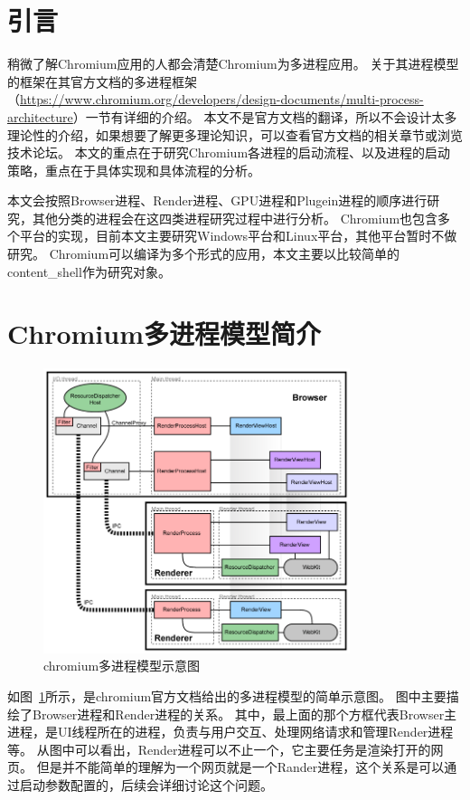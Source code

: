 
\section{引言}
稍微了解Chromium应用的人都会清楚Chromium为多进程应用。
关于其进程模型的框架在其官方文档的多进程框架（\url{https://www.chromium.org/developers/design-documents/multi-process-architecture}）一节有详细的介绍。
本文不是官方文档的翻译，所以不会设计太多理论性的介绍，如果想要了解更多理论知识，可以查看官方文档的相关章节或浏览技术论坛。
本文的重点在于研究Chromium各进程的启动流程、以及进程的启动策略，重点在于具体实现和具体流程的分析。

本文会按照Browser进程、Render进程、GPU进程和Plugein进程的顺序进行研究，其他分类的进程会在这四类进程研究过程中进行分析。
Chromium也包含多个平台的实现，目前本文主要研究Windows平台和Linux平台，其他平台暂时不做研究。
Chromium可以编译为多个形式的应用，本文主要以比较简单的content\_shell作为研究对象。

\section{Chromium多进程模型简介}

\begin{figure}[H] 
  \centering 
  \includegraphics[width=0.80\textwidth]{image/process_study/multi_process_architecture.png} 
  \caption{chromium多进程模型示意图} \label{fig:multi_process_architecture} 
\end{figure}

如图~\ref{fig:multi_process_architecture}所示，是chromium官方文档给出的多进程模型的简单示意图。
图中主要描绘了Browser进程和Render进程的关系。
其中，最上面的那个方框代表Browser主进程，是UI线程所在的进程，负责与用户交互、处理网络请求和管理Render进程等。
从图中可以看出，Render进程可以不止一个，它主要任务是渲染打开的网页。
但是并不能简单的理解为一个网页就是一个Rander进程，这个关系是可以通过启动参数配置的，后续会详细讨论这个问题。

